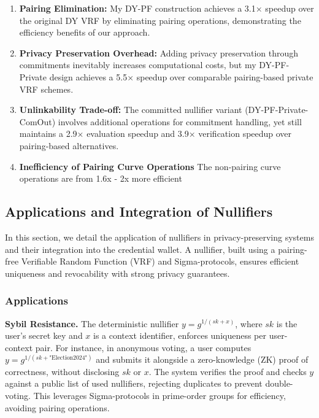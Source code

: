 \begin{enumerate}
    \item \textbf{Pairing Elimination:} My DY-PF construction achieves a 3.1× speedup over the original DY VRF by eliminating pairing operations, demonstrating the efficiency benefits of our approach.
    
    \item \textbf{Privacy Preservation Overhead:} Adding privacy preservation through commitments inevitably increases computational costs, but my DY-PF-Private design achieves a 5.5× speedup over comparable pairing-based private VRF schemes.
    
    \item \textbf{Unlinkability Trade-off:} The committed nullifier variant (DY-PF-Private-ComOut) involves additional operations for commitment handling, yet still maintains a 2.9× evaluation speedup and 3.9× verification speedup over pairing-based alternatives.

    \item \textbf{Inefficiency of Pairing Curve Operations} The non-pairing curve operations are from 1.6x - 2x more efficient
\end{enumerate}

















\subsection{Applications and Integration of Nullifiers}\label{sec-vrf-instantiation}

In this section, we detail the application of nullifiers in privacy-preserving systems and their integration into the credential wallet. A nullifier, built using a pairing-free Verifiable Random Function (VRF) and Sigma-protocols, ensures efficient uniqueness and revocability with strong privacy guarantees.

\subsubsection{Applications}

\textbf{Sybil Resistance.} The deterministic nullifier $y = g^{1/(sk + x)}$, where $sk$ is the user's secret key and $x$ is a context identifier, enforces uniqueness per user-context pair. For instance, in anonymous voting, a user computes $y = g^{1/(sk + \text{"Election2024"})}$ and submits it alongside a zero-knowledge (ZK) proof of correctness, without disclosing $sk$ or $x$. The system verifies the proof and checks $y$ against a public list of used nullifiers, rejecting duplicates to prevent double-voting. This leverages Sigma-protocols in prime-order groups for efficiency, avoiding pairing operations.

